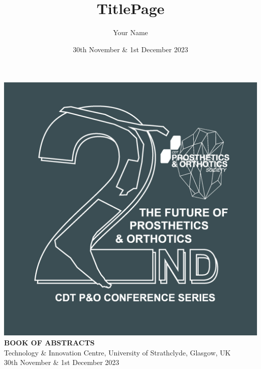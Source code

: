\title{TitlePage}
\author{Your Name}
\date{30th November \& 1st December 2023}

\begin{titlepage}
    \begin{center}
        \vspace{0.5cm}
        \includegraphics[width=1.0\textwidth]{graphic.jpg} 
        \newline
        \Huge
        \textbf{BOOK OF ABSTRACTS} \\
        \vspace{0.5cm}
        \large
            Technology \& Innovation Centre, University of Strathclyde, Glasgow, UK \\
            30th November \& 1st December 2023 
        \vspace{1cm}

        \vspace{0.5cm}
        
     \end{center}  

\end{titlepage}

%
